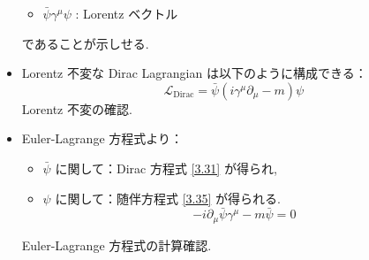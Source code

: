 \documentclass[a4paper,12pt]{article}
\begin{document}
\begin{itemize}
\begin{itemize}
      \item $\bar{\psi} \gamma^\mu \psi$ : Lorentz ベクトル
    \end{itemize}
    であることが示しせる.
    \item Lorentz 不変な Dirac Lagrangian は以下のように構成できる：
    \begin{equation*}
    \mathcal{L}_\text{Dirac} = \bar{\psi}(i \gamma^\mu \partial_\mu - m)\psi \tag{3.34}
    \end{equation*}
    \color{blue}
    Lorentz 不変の確認.
    \color{black}
    \item Euler-Lagrange 方程式より：
    \begin{itemize}
      \item $\bar{\psi}$ に関して：Dirac 方程式 \eqref{3.31} が得られ,
      \item $\psi$ に関して：随伴方程式 \eqref{3.35} が得られる.
      \begin{equation*}
      -i \partial_\mu \bar{\psi} \gamma^\mu - m \bar{\psi} = 0 \label{3.35}\tag{3.35}
      \end{equation*}
    \end{itemize}
    \color{blue}
    Euler-Lagrange 方程式の計算確認.
    \color{black}
  \end{itemize}
\end{document}
